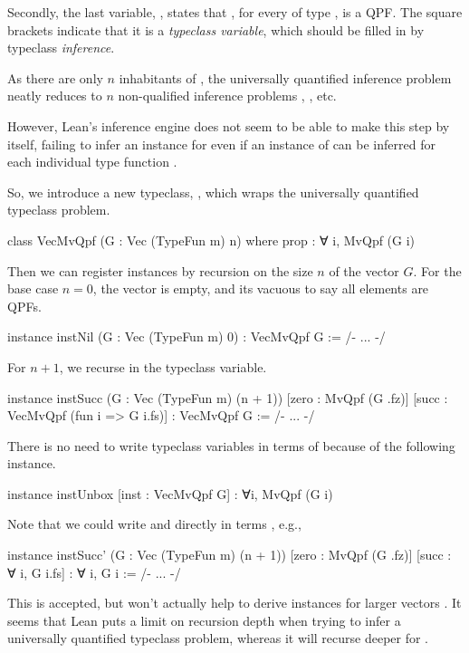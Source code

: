 Secondly, the last variable, , states that , for every  of type , is a QPF.
The square brackets indicate that it is a \emph{typeclass variable}, which should be filled in by typeclass \emph{inference}.

As there are only $n$ inhabitants of , the universally quantified inference problem  neatly reduces to $n$ non-qualified inference problems , , etc.

However, Lean's inference engine does not seem to be able to make this step by itself, failing to infer an instance for
 even if an instance of  can be inferred for each individual type function .

So, we introduce a new typeclass, , which wraps the universally quantified typeclass problem.
\begin{leancode}
    class VecMvQpf (G : Vec (TypeFun m) n) where
        prop : ∀ i, MvQpf (G i)
\end{leancode}

Then we can register instances by recursion on the size $n$ of the vector $G$.
For the base case $n=0$, the vector  is empty, and its vacuous to say all elements are QPFs.

\begin{leancode}
    instance instNil    (G : Vec (TypeFun m) 0) : VecMvQpf G
        := /- ... -/
\end{leancode}

For $n+1$, we recurse in the  typeclass variable.

\begin{leancode}
    instance instSucc   (G : Vec (TypeFun m) (n + 1)) 
                        [zero : MvQpf (G .fz)]
                        [succ : VecMvQpf (fun i => G i.fs)] : 
                            VecMvQpf G 
        := /- ... -/
\end{leancode}

There is no need to write typeclass variables in terms of  because of the following instance.
\begin{leancode}
    instance instUnbox [inst : VecMvQpf G] : 
        ∀i, MvQpf (G i)
\end{leancode}

Note that we could write  and  directly in terms , e.g.,
\begin{leancode}
    instance instSucc'  (G : Vec (TypeFun m) (n + 1)) 
                        [zero : MvQpf (G .fz)]
                        [succ : ∀ i, G i.fs] : 
                            ∀ i, G i 
        := /- ... -/
\end{leancode}
This is accepted, but won't actually help to derive instances for larger vectors .
It seems that Lean puts a limit on recursion depth when trying to infer a universally quantified 
typeclass problem, whereas it will recurse deeper for .





